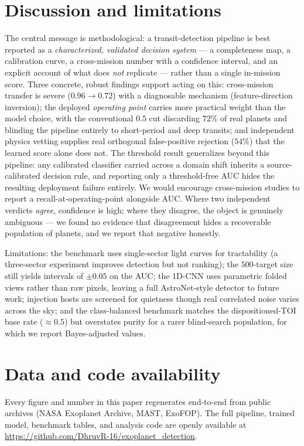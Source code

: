 \documentclass[11pt]{article}
\begin{document}
\section{Discussion and limitations}
The central message is methodological: a transit-detection pipeline is best
reported as a \emph{characterized, validated decision system} --- a completeness
map, a calibration curve, a cross-mission number with a confidence interval, and
an explicit account of what does \emph{not} replicate --- rather than a single
in-mission score. Three concrete, robust findings support acting on this:
cross-mission transfer is severe ($0.96\!\rightarrow\!0.72$) with a diagnosable
mechanism (feature-direction inversion); the deployed \emph{operating point}
carries more practical weight than the model choice, with the conventional $0.5$
cut discarding $72\%$ of real planets and blinding the pipeline entirely to
short-period and deep transits; and independent physics vetting supplies real
orthogonal false-positive rejection ($54\%$) that the learned score alone does not.
The threshold result generalizes beyond this pipeline: any calibrated classifier
carried across a domain shift inherits a source-calibrated decision rule, and
reporting only a threshold-free AUC hides the resulting deployment failure
entirely. We would encourage cross-mission studies to report a
recall-at-operating-point alongside AUC.
Where two independent verdicts \emph{agree}, confidence is high; where they
disagree, the object is genuinely ambiguous --- we found no evidence that
disagreement hides a recoverable population of planets, and we report that
negative honestly.

Limitations: the benchmark uses single-sector light curves for tractability (a
three-sector experiment improves detection but not ranking); the $500$-target size
still yields intervals of $\pm0.05$ on the AUC; the 1D-CNN uses parametric folded
views rather than raw pixels, leaving a full AstroNet-style detector to future
work; injection hosts are screened for quietness though real correlated noise
varies across the sky; and the class-balanced benchmark matches the dispositioned-TOI
base rate ($\approx0.5$) but overstates purity for a rarer blind-search population,
for which we report Bayes-adjusted values.

\section*{Data and code availability}
Every figure and number in this paper regenerates end-to-end from public archives
(NASA Exoplanet Archive, MAST, ExoFOP). The full pipeline, trained model, benchmark
tables, and analysis code are openly available at
\url{https://github.com/DhruvR-16/exoplanet_detection}.
\end{document}
